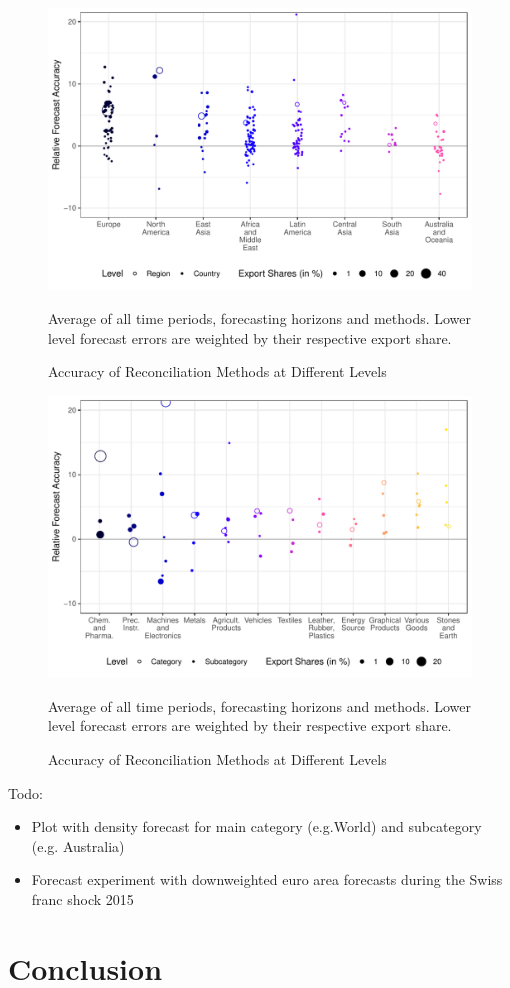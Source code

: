 \documentclass[a4paper,fleqn,11pt]{article}
\begin{document}
 \begin{figure}[H]
	\includegraphics[width=\textwidth]{fig/fig_eval_regions}
	\caption{Accuracy of Reconciliation Methods at Different Levels}
	\footnotesize{Average of all time periods, forecasting horizons and methods. Lower level forecast errors are weighted by their respective export share.}
\end{figure}

 \begin{figure}[H]
	\includegraphics[width=\textwidth]{fig/fig_eval_categories}
	\caption{Accuracy of Reconciliation Methods at Different Levels}
	\footnotesize{Average of all time periods, forecasting horizons and methods. Lower level forecast errors are weighted by their respective export share.}
\end{figure}
 
 Todo:
 \begin{itemize}
 	\item  Plot with density forecast for main category (e.g.World) and subcategory (e.g. Australia)
 	\item Forecast experiment with downweighted euro area forecasts during the Swiss franc shock 2015
 \end{itemize}


\clearpage

\section{Conclusion}







\clearpage

\setcounter{page}{3}



\clearpage



\end{document}
